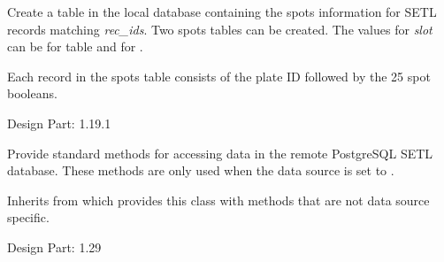 \documentclass[letterpaper,10pt,english]{sphinxmanual}
\begin{document}
\begin{fulllineitems}

\begin{fulllineitems}
\label{setlyze/database:setlyze.database.AccessLocalDB.set_species_spots}
Create a table in the local database containing the spots
information for SETL records matching \emph{rec\_ids}. Two spots
tables can be created. The values for \emph{slot} can be  for table
 and  for .

Each record in the spots table consists of the plate ID followed
by the 25 spot booleans.

Design Part: 1.19.1

\end{fulllineitems}


\end{fulllineitems}


\begin{fulllineitems}
\label{setlyze/database:setlyze.database.AccessRemoteDB}
Provide standard methods for accessing data in the remote
PostgreSQL SETL database. These methods are only used when the data
source is set to .

Inherits from {\hyperref[setlyze/database:setlyze.database.AccessDBGeneric]{}} which provides this
class with methods that are not data source specific.

Design Part: 1.29

\end{fulllineitems}

\end{document}

